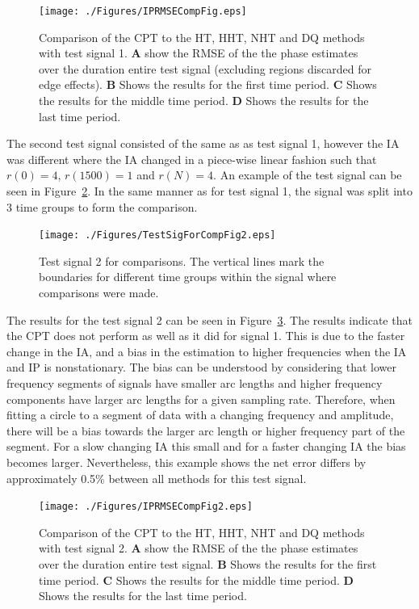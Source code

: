 \documentclass[journal,11pt,a4paper,onecolumn,draftcls]{IEEEtran}
\begin{document}
\begin{figure}[!h]
	\centering
		\texttt{[image: ./Figures/IPRMSECompFig.eps]}
	\caption{Comparison of the CPT to the HT, HHT, NHT and DQ methods with test signal 1. \textbf{A} show the RMSE of the the phase estimates over the duration entire test signal (excluding regions discarded for edge effects). \textbf{B} Shows the results for the first time period. \textbf{C} Shows the results for the middle time period. \textbf{D} Shows the results for the last time period.}
	\label{fig:ResultsTestSig1}
\end{figure}

The second test signal consisted of the same as as test signal 1, however the IA was different where the IA changed in a piece-wise linear fashion such that $r(0)=4$, $r(1500)=1$ and $r(N) = 4$. An example of the test signal can be seen in Figure~\ref{fig:TestSig2}. In the same manner as for test signal 1, the signal was split into 3 time groups to form the comparison.

\begin{figure}[!ht]
	\centering
		\texttt{[image: ./Figures/TestSigForCompFig2.eps]}
	\caption{Test signal 2 for comparisons. The vertical lines mark the boundaries for different time groups within the signal where comparisons were made. }
	\label{fig:TestSig2}
\end{figure}

The results for the test signal 2 can be seen in Figure~\ref{fig:ResultsTestSig2}. The results indicate that the CPT does not perform as well as it did for signal 1. This is due to the faster change in the IA, and a bias in the estimation to higher frequencies when the IA and IP is nonstationary. The bias can be understood by considering that lower frequency segments of signals have smaller arc lengths and higher frequency components have larger arc lengths for a given sampling rate. Therefore, when fitting a circle to a segment of data with a changing frequency and amplitude, there will be a bias towards the larger arc length or higher frequency part of the segment. For a slow changing IA this small and for a faster changing IA the bias becomes larger. Nevertheless, this example shows the net error differs by approximately 0.5\% between all methods for this test signal.
\begin{figure}[!ht]
	\centering
		\texttt{[image: ./Figures/IPRMSECompFig2.eps]}
	\caption{Comparison of the CPT to the HT, HHT, NHT and DQ methods with test signal 2. \textbf{A} show the RMSE of the the phase estimates over the duration entire test signal. \textbf{B} Shows the results for the first time period. \textbf{C} Shows the results for the middle time period. \textbf{D} Shows the results for the last time period.}
	\label{fig:ResultsTestSig2}
\end{figure}
\end{document}
